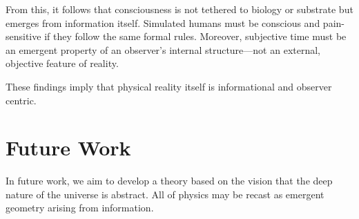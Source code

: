 \documentclass[11pt]{article}
\begin{document}
From this, it follows that consciousness is not tethered to biology or substrate but emerges from information itself. Simulated humans must be conscious and pain-sensitive if they follow the same formal rules. Moreover, subjective time must be an emergent property of an observer’s internal structure—not an external, objective feature of reality.

These findings imply that physical reality itself is informational and observer centric.


\section*{Future Work}


In future work, we aim to develop a theory based on the vision that the deep nature of the universe is abstract. All of physics may be recast as emergent geometry arising from information.
\end{document}
